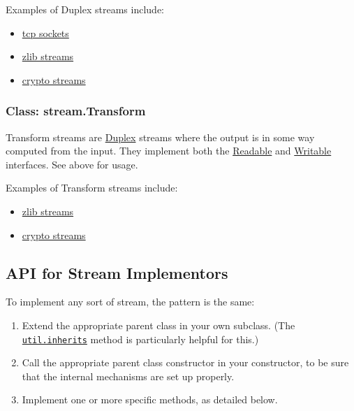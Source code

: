 Examples of Duplex streams include:

\begin{itemize}
\itemsep1pt\parskip0pt
\item
  \href{net.html\#net_class_net_socket}{tcp sockets}
\item
  \href{zlib.html}{zlib streams}
\item
  \href{crypto.html}{crypto streams}
\end{itemize}

\subsubsection{Class: stream.Transform}\label{class-stream.transform}

Transform streams are
\hyperref[streamux5fclassux5fstreamux5fduplex]{Duplex} streams where the
output is in some way computed from the input. They implement both the
\hyperref[streamux5fclassux5fstreamux5freadable]{Readable} and
\hyperref[streamux5fclassux5fstreamux5fwritable]{Writable} interfaces.
See above for usage.

Examples of Transform streams include:

\begin{itemize}
\itemsep1pt\parskip0pt
\item
  \href{zlib.html}{zlib streams}
\item
  \href{crypto.html}{crypto streams}
\end{itemize}

\subsection{API for Stream
Implementors}\label{api-for-stream-implementors}

To implement any sort of stream, the pattern is the same:

\begin{enumerate}
\def\labelenumi{\arabic{enumi}.}
\itemsep1pt\parskip0pt
\item
  Extend the appropriate parent class in your own subclass. (The
  \href{util.html\#util_util_inherits_constructor_superconstructor}{\texttt{util.inherits}}
  method is particularly helpful for this.)
\item
  Call the appropriate parent class constructor in your constructor, to
  be sure that the internal mechanisms are set up properly.
\item
  Implement one or more specific methods, as detailed below.
\end{enumerate}

